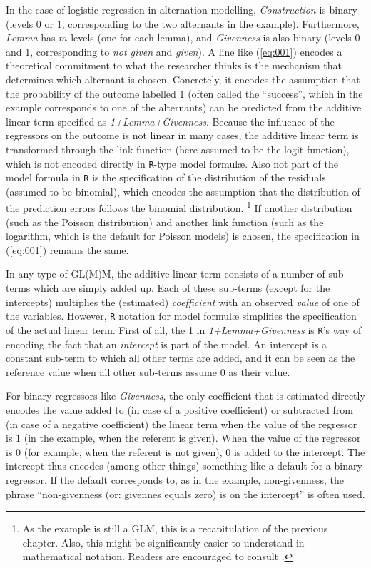 
In the case of logistic regression in alternation modelling, \textit{Construction} is binary (levels 0 or 1, corresponding to the two alternants in the example).
Furthermore, \textit{Lemma} has $m$ levels (one for each lemma), and \textit{Givenness} is also binary (levels 0 and 1, corresponding to \textit{not given} and \textit{given}).
A line like (\ref{eq:001}) encodes a theoretical commitment to what the researcher thinks is the mechanism that determines which alternant is chosen.
Concretely, it encodes the assumption that the probability of the outcome labelled 1 (often called the ``success'', which in the example corresponds to one of the alternants) can be predicted from the additive linear term specified as \textit{1+Lemma+Givenness}.
Because the influence of the regressors on the outcome is not linear in many cases, the additive linear term is transformed through the link function (here assumed to be the logit function), which is not encoded directly in \texttt{R}-type model formulæ.
Also not part of the model formula in \texttt{R} is the specification of the distribution of the residuals (assumed to be binomial), which encodes the assumption that the distribution of the prediction errors follows the binomial distribution.%
\footnote{As the example is still a GLM, this is a recapitulation of the previous chapter.
Also, this might be significantly easier to understand in mathematical notation.
Readers are encouraged to consult \citet{GelmanHill2006}.}
If another distribution (such as the Poisson distribution) and another link function (such as the logarithm, which is the default for Poisson models) is chosen, the specification in (\ref{eq:001}) remains the same.

In any type of GL(M)M, the additive linear term consists of a number of sub-terms which are simply added up.
Each of these sub-terms (except for the intercepts) multiplies the (estimated) \textit{coefficient} with an observed \textit{value} of one of the variables.
However, \texttt{R} notation for model formulæ simplifies the specification of the actual linear term.
First of all, the 1 in \textit{1+Lemma+Givenness} is \texttt{R}'s way of encoding the fact that an \textit{intercept} is part of the model.
An intercept is a constant sub-term to which all other terms are added, and it can be seen as the reference value when all other sub-terms assume 0 as their value.

For binary regressors like \textit{Givenness}, the only coefficient that is estimated directly encodes the value added to (in case of a positive coefficient) or subtracted from (in case of a negative coefficient) the linear term when the value of the regressor is 1 (in the example, when the referent is given).
When the value of the regressor is 0 (for example, when the referent is not given), 0 is added to the intercept.
The intercept thus encodes (among other things) something like a default for a binary regressor.
If the default corresponds to, as in the example, non-givenness, the phrase ``non-givenness (or: givennes equals zero) is on the intercept'' is often used.

